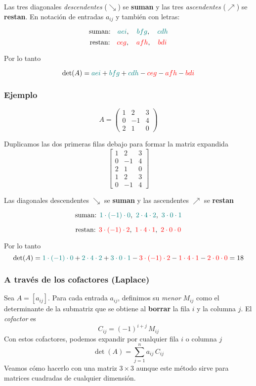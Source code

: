\documentclass{article}
\begin{document}
Las tres diagonales \emph{descendentes} (\(\searrow\)) se \textbf{suman} y las tres \emph{ascendentes} (\(\nearrow\)) se \textbf{restan}. En notación de entradas \(a_{ij}\) y también con letras:

\[
\text{suman:}\quad
{\color{teal}{aei}},\quad
{\color{teal}{bfg}},\quad
{\color{teal}{cdh}}
\]
\[
\text{restan:}\quad
{\color{red}{ceg}},\quad
{\color{red}{afh}},\quad
{\color{red}{bdi}}
\]

Por lo tanto

\[
\det(A)={\color{teal}{aei}}+{\color{teal}{bfg}}+{\color{teal}{cdh}}-{\color{red}{ceg}}-{\color{red}{afh}}-{\color{red}{bdi}}
\]


\subsubsection*{Ejemplo}

\[
A=\begin{pmatrix}
1 & 2 & 3\\
0 & -1 & 4\\
2 & 1 & 0
\end{pmatrix}
\]

Duplicamos las dos primeras filas debajo para formar la matriz expandida
\[
\left[
\begin{array}{ccc}
1 & 2 & 3\\
0 & -1 & 4\\
2 & 1 & 0\\
1 & 2 & 3\\
0 & -1 & 4
\end{array}
\right]
\]

Las diagonales descendentes \(\searrow\) se \textbf{suman} y las ascendentes \(\nearrow\) se \textbf{restan}

\[
\text{suman: } {\color{teal}{1\cdot(-1)\cdot 0}},\ {\color{teal}{2\cdot 4\cdot 2}},\ {\color{teal}{3\cdot 0\cdot 1}}
\]

\[
\text{restan: } {\color{red}{3\cdot(-1)\cdot 2}},\ {\color{red}{1\cdot 4\cdot 1}},\ {\color{red}{2\cdot 0\cdot 0}}
\]

Por lo tanto
\[
\det(A)={\color{teal}{1\cdot(-1)\cdot 0}}+{\color{teal}{2\cdot 4\cdot 2}}+{\color{teal}{3\cdot 0\cdot 1}}-{\color{red}{3\cdot(-1)\cdot 2}}-{\color{red}{1\cdot 4\cdot 1}}-{\color{red}{2\cdot 0\cdot 0}}=18
\]

\subsubsection*{A través de los cofactores (Laplace)}
Sea \(A=[a_{ij}]\). Para cada entrada \(a_{ij}\), definimos su \emph{menor} \(M_{ij}\) como el determinante de la submatriz que se obtiene al \textbf{borrar} la fila \(i\) y la columna \(j\). El \emph{cofactor} es
\[
C_{ij}=(-1)^{i+j}\,M_{ij}
\]
Con estos cofactores, podemos expandir por cualquier fila \(i\) o columna \(j\)
\[
\det(A)=\sum_{j=1}^{n} a_{ij}\,C_{ij}
\]
Veamos cómo hacerlo con una matriz \(3\times 3\) aunque este método sirve para matrices cuadradas de cualquier dimensión.
\end{document}
